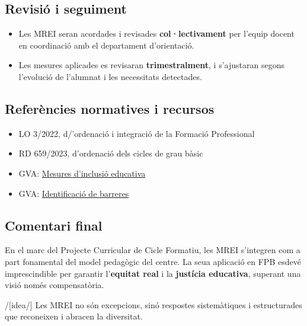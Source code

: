 \documentclass[
  paper=a4,
  ,captions=tableheading
]{scrartcl}
\providecommand{\tightlist}{%
  \setlength{\itemsep}{0pt}\setlength{\parskip}{0pt}}
\renewenvironment{quote}{\begin{customblockquote}\list{}{\rightmargin=0em\leftmargin=0em}%
\item\relax\color{blockquote-text}\ignorespaces}{\unskip\unskip\endlist\end{customblockquote}}
\begin{document}
\hypertarget{revisiuxf3-i-seguiment}{%
\subsection{Revisió i seguiment}\label{revisiuxf3-i-seguiment}}

\begin{itemize}
\tightlist
\item
  Les MREI seran acordades i revisades \textbf{col·lectivament} per
  l'equip docent en coordinació amb el departament d'orientació.
\item
  Les mesures aplicades es revisaran \textbf{trimestralment}, i
  s'ajustaran segons l'evolució de l'alumnat i les necessitats
  detectades.
\end{itemize}

\hypertarget{referuxe8ncies-normatives-i-recursos}{%
\subsection{Referències normatives i
recursos}\label{referuxe8ncies-normatives-i-recursos}}

\begin{itemize}
\tightlist
\item
  LO 3/2022, d/'ordenació i integració de la Formació Professional
\item
  RD 659/2023, d'ordenació dels cicles de grau bàsic
\item
  GVA: \href{https://ceice.gva.es/va/web/inclusioeducativa}{Mesures
  d'inclusió educativa}
\item
  GVA:
  \href{https://ceice.gva.es/es/web/inclusioeducativa/identificacio-de-barreres}{Identificació
  de barreres}
\end{itemize}

\hypertarget{comentari-final}{%
\subsection{Comentari final}\label{comentari-final}}

En el marc del Projecte Curricular de Cicle Formatiu, les MREI
s'integren com a part fonamental del model pedagògic del centre. La seua
aplicació en FPB esdevé imprescindible per garantir l'\textbf{equitat
real} i la \textbf{justícia educativa}, superant una visió només
compensatòria.

\begin{quote}
/{[}idea/{]} Les MREI no són excepcions, sinó respostes sistemàtiques i
estructurades que reconeixen i abracen la diversitat.
\end{quote}
\end{document}
